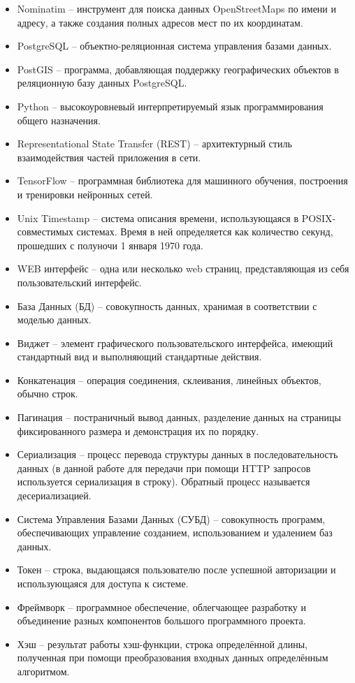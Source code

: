\begin{itemize}
	\item Nominatim -- инструмент для поиска данных OpenStreetMaps по имени и адресу, а также создания полных адресов мест по их координатам.
	\item PostgreSQL -- объектно-реляционная система управления базами данных.
	\item PostGIS -- программа, добавляющая поддержку географических объектов в реляционную базу данных PostgreSQL.
	\item Python -- высокоуровневый интерпретируемый язык программирования общего назначения.
	\item Representational State Transfer (REST) -- архитектурный стиль взаимодействия частей приложения в сети.
	\item TensorFlow -- программная библиотека для машинного обучения, построения и тренировки нейронных сетей.
	\item Unix Timestamp -- система описания времени, использующаяся в POSIX-совместимых системах. Время в ней определяется как количество секунд, прошедших с полуночи 1 января 1970 года.
	\item WEB интерфейс -- одна или несколько web страниц, представляющая из себя пользовательский интерфейс.
	\item База Данных (БД) -- совокупность данных, хранимая в соответствии с моделью данных.
	\item Виджет -- элемент графического пользовательского интерфейса, имеющий стандартный вид и выполняющий стандартные действия.
	\item Конкатенация -- операция соединения, склеивания, линейных объектов, обычно строк.
	\item Пагинация -- постраничный вывод данных, разделение данных на страницы фиксированного размера и демонстрация их по порядку.
	\item Сериализация -- процесс перевода структуры данных в последовательность данных (в данной работе для передачи при помощи HTTP запросов используется сериализация в строку). Обратный процесс называется десериализацией.
	\item Система Управления Базами Данных (СУБД) -- совокупность программ, обеспечивающих управление созданием, использованием и удалением баз данных.
	\item Токен -- строка, выдающаяся пользователю после успешной авторизации и использующаяся для доступа к системе.
	\item Фреймворк -- программное обеспечение, облегчающее разработку и объединение разных компонентов большого программного проекта.
	\item Хэш -- результат работы хэш-функции, строка определённой длины, полученная при помощи преобразования входных данных определённым алгоритмом.
\end{itemize}
